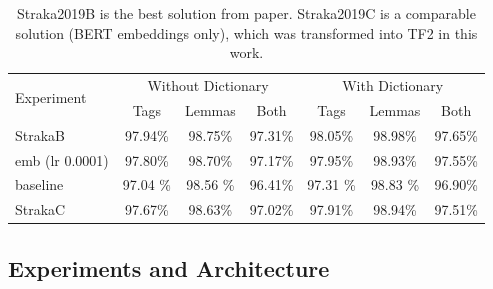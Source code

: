 	




\begin{table}[!h]
  \begin{tabular}{|l||c|c|c||c|c|c|}
  \hline
\multirow{2}{*}{Experiment} & \multicolumn{3}{c||}{Without Dictionary}  &
      \multicolumn{3}{c|}{With Dictionary} \\ 
    & Tags & Lemmas & Both & Tags & Lemmas & Both \\ \hline
    StrakaB & 97.94\% & 98.75\% & 97.31\% & 98.05\% & 98.98\% & 97.65\% \\ \hline
    emb (lr 0.0001) &  97.80\% & 98.70\% & 97.17\% & 97.95\% & 98.93\% & 97.55\% \\ \hline
    baseline & 97.04 \% & 98.56 \% & 96.41\% &  97.31  \% & 98.83 \% & 96.90\% \\ \hline 
    StrakaC & 97.67\% & 98.63\% & 97.02\% & 97.91\% & 98.94\% & 97.51\% \\ \hline
  \end{tabular}
  \caption{%
  Straka2019B is the best solution from \citep{Straka2019} paper. Straka2019C is a comparable solution  (BERT embeddings only), which was transformed into TF2 in this work.} 
\end{table}

\subsection{Experiments and Architecture}




